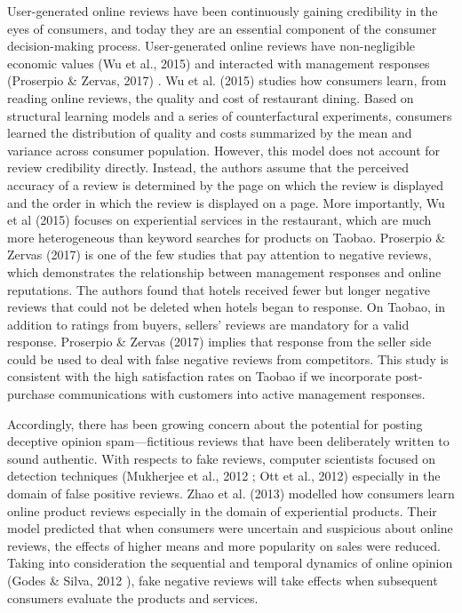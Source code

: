 ﻿\documentclass[a4paper,10pt]{article}
\begin{document}
User-generated online reviews have been continuously gaining credibility in the eyes of consumers, and today they are an essential component of the consumer decision-making process. User-generated online reviews have non-negligible economic values (Wu et al., 2015) \cite{Wu2015} and interacted with management responses (Proserpio \& Zervas, 2017) \cite{Proserpio2017}. Wu et al. (2015) \cite{Wu2015} studies how consumers learn, from reading online reviews, the quality and cost of restaurant dining. Based on structural learning models and a series of counterfactural experiments, consumers learned the distribution of quality and costs summarized by the mean and variance across consumer population. However, this model does not account for review credibility directly. Instead, the authors assume that the perceived accuracy of a review is determined by the page on which the review is displayed and the order in which the review is displayed on a page. More importantly, Wu et al (2015) \cite{Wu2015} focuses on experiential services in the restaurant, which are much more heterogeneous than keyword searches for products on Taobao. Proserpio \& Zervas (2017) \cite{Proserpio2017} is one of the few studies that pay attention to negative reviews, which demonstrates the relationship between management responses and online reputations. The authors found that hotels received fewer but longer negative reviews that could not be deleted when hotels began to response. On Taobao, in addition to ratings from buyers, sellers' reviews are mandatory for a valid response. Proserpio \& Zervas (2017) \cite{Proserpio2017} implies that response from the seller side could be used to deal with false negative reviews from competitors. This study is consistent with the high satisfaction rates on Taobao if we incorporate post-purchase communications with customers into active management responses. 

Accordingly, there has been growing concern about the potential for posting deceptive opinion spam—fictitious reviews that have been deliberately written to sound authentic. With respects to fake reviews, computer scientists focused on detection techniques (Mukherjee et al., 2012 \cite{Mukherjee2012}; Ott et al., 2012\cite{Ott2012}) especially in the domain of false positive reviews. Zhao et al. (2013) \cite{Zhao2013} modelled how consumers learn online product reviews especially in the domain of experiential products. Their model predicted that when consumers were uncertain and suspicious about online reviews, the effects of higher means and more popularity on sales were reduced. Taking into consideration the sequential and temporal dynamics of online opinion (Godes & Silva, 2012 \cite{Godes2012}), fake negative reviews will take effects when subsequent consumers evaluate the products and services. 
\end{document}
